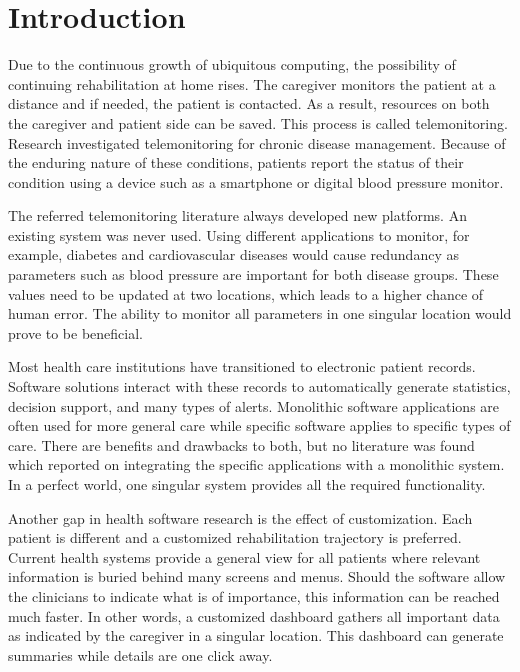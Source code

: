 \section{Introduction}

Due to the continuous growth of ubiquitous computing, the possibility of continuing rehabilitation at home rises. The caregiver monitors the patient at a distance and if needed, the patient is contacted. As a result, resources on both the caregiver and patient side can be saved. This process is called telemonitoring. Research investigated telemonitoring for chronic disease management. Because of the enduring nature of these conditions, patients report the status of their condition using a device such as a smartphone or digital blood pressure monitor.

The referred telemonitoring literature always developed new platforms. An existing system was never used. Using different applications to monitor, for example, diabetes and cardiovascular diseases would cause redundancy as parameters such as blood pressure are important for both disease groups. These values need to be updated at two locations, which leads to a higher chance of human error. The ability to monitor all parameters in one singular location would prove to be beneficial.

Most health care institutions have transitioned to electronic patient records. Software solutions interact with these records to automatically generate statistics, decision support, and many types of alerts. Monolithic software applications are often used for more general care while specific software applies to specific types of care. There are benefits and drawbacks to both, but no literature was found which reported on integrating the specific applications with a monolithic system. In a perfect world, one singular system provides all the required functionality.

Another gap in health software research is the effect of customization. Each patient is different and a customized rehabilitation trajectory is preferred. Current health systems provide a general view for all patients where relevant information is buried behind many screens and menus. Should the software allow the clinicians to indicate what is of importance, this information can be reached much faster. In other words, a customized dashboard gathers all important data as indicated by the caregiver in a singular location. This dashboard can generate summaries while details are one click away. 

